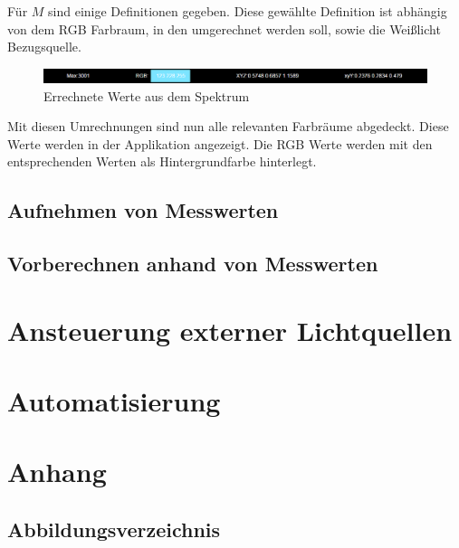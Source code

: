 \documentclass[11pt]{scrartcl}
\begin{document}
Für $M$ sind einige Definitionen gegeben. Diese gewählte Definition ist abhängig von dem RGB Farbraum, in den umgerechnet werden soll, sowie
die Weißlicht Bezugsquelle.
\begin{figure}[H]
    \begin{center}
        \includegraphics[width=\textwidth]{images/app_dummy_info_with_rgb.png}
    \end{center}
    \caption{Errechnete Werte aus dem Spektrum}
\end{figure}
\noindent
Mit diesen Umrechnungen sind nun alle relevanten Farbräume abgedeckt. Diese Werte werden in der Applikation angezeigt. Die RGB Werte werden mit
den entsprechenden Werten als Hintergrundfarbe hinterlegt.
\subsection{Aufnehmen von Messwerten}
\subsection{Vorberechnen anhand von Messwerten}
\clearpage

\section{Ansteuerung externer Lichtquellen}
\clearpage

\section{Automatisierung}
\clearpage

\renewcommand{\thesubsection}{\Alph{subsection}}
\section*{Anhang}

\subsection{Abbildungsverzeichnis}
\begingroup
\renewcommand{\section}[2]{}
\listoffigures
\endgroup
\clearpage
\end{document}
